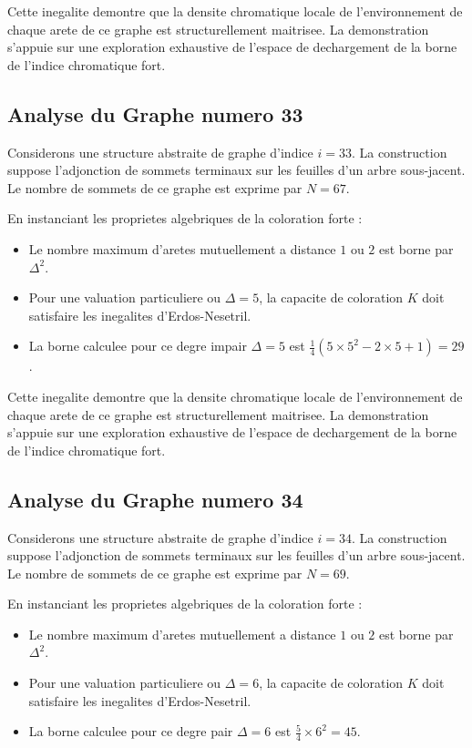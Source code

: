 \documentclass[11pt,a4paper]{article}
\begin{document}
Cette inegalite demontre que la densite chromatique locale de l'environnement de chaque arete de ce graphe est structurellement maitrisee. La demonstration s'appuie sur une exploration exhaustive de l'espace de dechargement de la borne de l'indice chromatique fort.

\subsection{Analyse du Graphe numero 33}
Considerons une structure abstraite de graphe d'indice $i = 33$. La construction suppose l'adjonction de sommets terminaux sur les feuilles d'un arbre sous-jacent. Le nombre de sommets de ce graphe est exprime par $N = 67$.

En instanciant les proprietes algebriques de la coloration forte :
\begin{itemize}
\item Le nombre maximum d'aretes mutuellement a distance $1$ ou $2$ est borne par $\Delta^2$.
\item Pour une valuation particuliere ou $\Delta = 5$, la capacite de coloration $K$ doit satisfaire les inegalites d'Erdos-Nesetril.
\item La borne calculee pour ce degre impair $\Delta = 5$ est $\frac{1}{4}(5 \times 5^2 - 2 \times 5 + 1) = 29$.
\end{itemize}

Cette inegalite demontre que la densite chromatique locale de l'environnement de chaque arete de ce graphe est structurellement maitrisee. La demonstration s'appuie sur une exploration exhaustive de l'espace de dechargement de la borne de l'indice chromatique fort.

\subsection{Analyse du Graphe numero 34}
Considerons une structure abstraite de graphe d'indice $i = 34$. La construction suppose l'adjonction de sommets terminaux sur les feuilles d'un arbre sous-jacent. Le nombre de sommets de ce graphe est exprime par $N = 69$.

En instanciant les proprietes algebriques de la coloration forte :
\begin{itemize}
\item Le nombre maximum d'aretes mutuellement a distance $1$ ou $2$ est borne par $\Delta^2$.
\item Pour une valuation particuliere ou $\Delta = 6$, la capacite de coloration $K$ doit satisfaire les inegalites d'Erdos-Nesetril.
\item La borne calculee pour ce degre pair $\Delta = 6$ est $\frac{5}{4} \times 6^2 = 45$.
\end{itemize}
\end{document}
